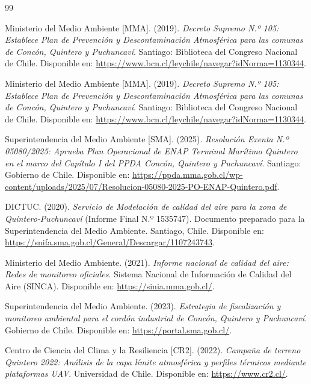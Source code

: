 \documentclass[letterpaper,12pt]{article}
\begin{document}
\begin{thebibliography}{99}

 Ministerio del Medio Ambiente [MMA]. (2019). \textit{Decreto Supremo N.º 105: Establece Plan de Prevención y Descontaminación Atmosférica para las comunas de Concón, Quintero y Puchuncaví}. Santiago: Biblioteca del Congreso Nacional de Chile. Disponible en: \url{https://www.bcn.cl/leychile/navegar?idNorma=1130344}.

 Ministerio del Medio Ambiente [MMA]. (2019). \textit{Decreto Supremo N.º 105: Establece Plan de Prevención y Descontaminación Atmosférica para las comunas de Concón, Quintero y Puchuncaví}. Santiago: Biblioteca del Congreso Nacional de Chile. Disponible en: \url{https://www.bcn.cl/leychile/navegar?idNorma=1130344}.

 Superintendencia del Medio Ambiente [SMA]. (2025). \textit{Resolución Exenta N.º 05080/2025: Aprueba Plan Operacional de ENAP Terminal Marítimo Quintero en el marco del Capítulo I del PPDA Concón, Quintero y Puchuncaví}. Santiago: Gobierno de Chile. Disponible en: \url{https://ppda.mma.gob.cl/wp-content/uploads/2025/07/Resolucion-05080-2025-PO-ENAP-Quintero.pdf}.

 DICTUC. (2020). \textit{Servicio de Modelación de calidad del aire para la zona de Quintero-Puchuncaví} (Informe Final N.º 1535747). Documento preparado para la Superintendencia del Medio Ambiente. Santiago, Chile. Disponible en: \url{https://snifa.sma.gob.cl/General/Descargar/1107243743}.

 Ministerio del Medio Ambiente. (2021). \textit{Informe nacional de calidad del aire: Redes de monitoreo oficiales}. Sistema Nacional de Información de Calidad del Aire (SINCA). Disponible en: \url{https://sinia.mma.gob.cl/}.

 Superintendencia del Medio Ambiente. (2023). \textit{Estrategia de fiscalización y monitoreo ambiental para el cordón industrial de Concón, Quintero y Puchuncaví}. Gobierno de Chile. Disponible en: \url{https://portal.sma.gob.cl/}.

 Centro de Ciencia del Clima y la Resiliencia [CR2]. (2022). \textit{Campaña de terreno Quintero 2022: Análisis de la capa límite atmosférica y perfiles térmicos mediante plataformas UAV}. Universidad de Chile. Disponible en: \url{https://www.cr2.cl/}.


\end{thebibliography}
\end{document}
